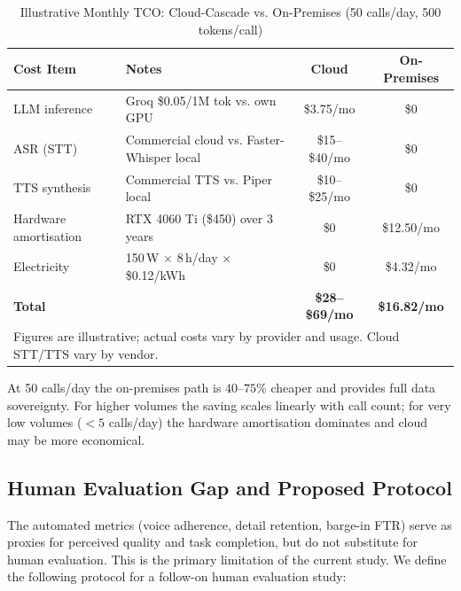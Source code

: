 \documentclass[11pt,a4paper]{article}
\begin{document}
\begin{table}[htbp]
\centering\small
\caption{Illustrative Monthly TCO: Cloud-Cascade vs. On-Premises (50 calls/day, 500 tokens/call)}
\label{tab:cost_analysis}
\renewcommand{\arraystretch}{1.25}
\begin{tabularx}{\textwidth}{lXcc}
\toprule
\textbf{Cost Item} & \textbf{Notes} & \textbf{Cloud} & \textbf{On-Premises} \\
\midrule
LLM inference & Groq \$0.05/1M tok vs. own GPU & \$3.75/mo & \$0 \\
ASR (STT) & Commercial cloud vs. Faster-Whisper local & \$15--\$40/mo & \$0 \\
TTS synthesis & Commercial TTS vs. Piper local & \$10--\$25/mo & \$0 \\
Hardware amortisation & RTX 4060 Ti (\$450) over 3 years & \$0 & \$12.50/mo \\
Electricity & 150\,W $\times$ 8\,h/day $\times$ \$0.12/kWh & \$0 & \$4.32/mo \\
\midrule
\textbf{Total} & & \textbf{\$28--\$69/mo} & \textbf{\$16.82/mo} \\
\bottomrule
\multicolumn{4}{l}{\small Figures are illustrative; actual costs vary by provider and usage. Cloud STT/TTS vary by vendor.}
\end{tabularx}
\end{table}

At 50 calls/day the on-premises path is $40$--$75\%$ cheaper and provides full data sovereignty. For higher volumes the saving scales linearly with call count; for very low volumes ($<5$ calls/day) the hardware amortisation dominates and cloud may be more economical.

\subsection{Human Evaluation Gap and Proposed Protocol}
\label{subsec:human_eval}

The automated metrics (voice adherence, detail retention, barge-in FTR) serve as proxies for perceived quality and task completion, but do not substitute for human evaluation. This is the primary limitation of the current study. We define the following protocol for a follow-on human evaluation study:
\end{document}
